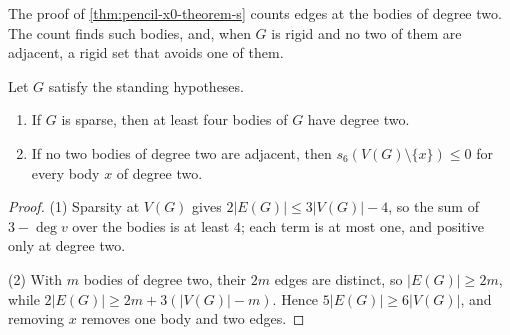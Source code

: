 The proof of \cref{thm:pencil-x0-theorem-s} counts edges at the bodies
of degree two. The count finds such bodies, and, when $G$ is rigid and
no two of them are adjacent, a rigid set that avoids one of them.

\begin{lemma}
  \label{lem:pencil-x0-sparse-count}
  \leanok
  Let $G$ satisfy the standing hypotheses.
  \begin{enumerate}
    \item If $G$ is sparse, then at least four bodies of $G$ have degree
      two.
    \item If no two bodies of degree two are adjacent, then
      $s_6(V(G) \setminus \{x\}) \le 0$ for every body $x$ of degree
      two.
  \end{enumerate}
\end{lemma}
\begin{proof}
  \leanok
  (1) Sparsity at $V(G)$ gives $2|E(G)| \le 3|V(G)| - 4$, so the sum of
  $3 - \deg v$ over the bodies is at least $4$; each term is at most
  one, and positive only at degree two.

  (2) With $m$ bodies of degree two, their $2m$ edges are distinct, so
  $|E(G)| \ge 2m$, while $2|E(G)| \ge 2m + 3(|V(G)| - m)$. Hence
  $5|E(G)| \ge 6|V(G)|$, and removing $x$ removes one body and two
  edges.
\end{proof}

